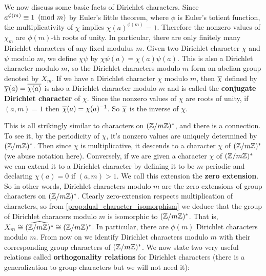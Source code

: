       We now discuss some basic facts of Dirichlet characters. Since $a^{\phi(m)} \equiv 1 \ \left(\text{mod }m\right)$  by Euler's little theorem, where $\phi$ is Euler's totient function, the multiplicativity of $\chi$ implies $\chi(a)^{\phi(m)} = 1$. Therefore the nonzero values of $\chi_{m}$ are $\phi(m)$-th roots of unity. In particular, there are only finitely many Dirichlet characters of any fixed modulus $m$. Given two Dirichlet character $\chi$ and $\psi$ modulo $m$, we define $\chi\psi$ by $\chi\psi(a) = \chi(a)\psi(a)$. This is also a Dirichlet character modulo $m$, so the Dirichlet characters modulo $m$ form an abelian group denoted by $X_{m}$. If we have a Dirichlet character $\chi$ modulo $m$, then $\overline{\chi}$ defined by $\overline{\chi}(a) = \overline{\chi(a)}$ is also a Dirichlet character modulo $m$ and is called the \textbf{conjugate Dirichlet character} of $\chi$. Since the nonzero values of $\chi$ are roots of unity, if $(a,m) = 1$ then $\overline{\chi}(a) = \chi(a)^{-1}$. So $\overline{\chi}$ is the inverse of $\chi$.

      This is all strikingly similar to characters on $(\mathbb{Z}/m\mathbb{Z})^{\ast}$, and there is a connection. To see it, by the periodicity of $\chi$, it's nonzero values are uniquely determined by $(\mathbb{Z}/m\mathbb{Z})^{\ast}$. Then since $\chi$ is multiplicative, it descends to a character $\chi$ of $(\mathbb{Z}/m\mathbb{Z})^{\ast}$ (we abuse notation here). Conversely, if we are given a character $\chi$ of $(\mathbb{Z}/m\mathbb{Z})^{\ast}$ we can extend it to a Dirichlet character by defining it to be $m$-periodic and declaring $\chi(a) = 0$ if $(a,m) > 1$. We call this extension the \textbf{zero extension}. So in other words, Dirichlet characters modulo $m$ are the zero extensions of group characters on $(\mathbb{Z}/m\mathbb{Z})^{\ast}$. Clearly zero-extension respects multiplication of characters, so from \cref{prop:dual_character_isomorphism} we deduce that the group of Dirichlet characers modulo $m$ is isomorphic to $(\mathbb{Z}/m\mathbb{Z})^{\ast}$. That is, $X_{m} \cong \widehat{(\mathbb{Z}/m\mathbb{Z})^{\ast}} \cong (\mathbb{Z}/m\mathbb{Z})^{\ast}$. In particular, there are $\phi(m)$ Dirichlet characters modulo $m$. From now on we identify Dirichlet characters modulo $m$ with their corresponding group characters of $(\mathbb{Z}/m\mathbb{Z})^{\ast}$. We now state two very useful relations called \textbf{orthogonality relations} for Dirichlet characters (there is a generalization to group characters but we will not need it):

